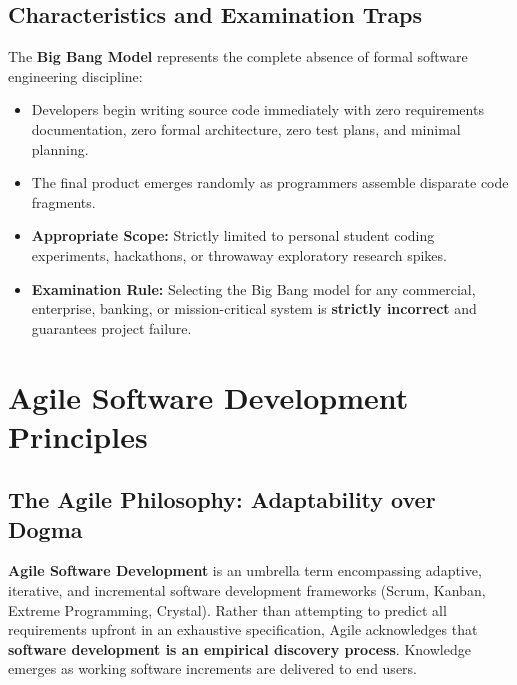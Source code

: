 \subsection{Characteristics and Examination Traps}
The \textbf{Big Bang Model} represents the complete absence of formal software engineering discipline:
\begin{itemize}
    \item Developers begin writing source code immediately with zero requirements documentation, zero formal architecture, zero test plans, and minimal planning.
    \item The final product emerges randomly as programmers assemble disparate code fragments.
    \item \textbf{Appropriate Scope:} Strictly limited to personal student coding experiments, hackathons, or throwaway exploratory research spikes.
    \item \textbf{Examination Rule:} Selecting the Big Bang model for any commercial, enterprise, banking, or mission-critical system is \textbf{strictly incorrect} and guarantees project failure.
\end{itemize}



\section{Agile Software Development Principles}
\label{sec:se_agile_principles}

\subsection{The Agile Philosophy: Adaptability over Dogma}
\textbf{Agile Software Development} is an umbrella term encompassing adaptive, iterative, and incremental software development frameworks (Scrum, Kanban, Extreme Programming, Crystal). Rather than attempting to predict all requirements upfront in an exhaustive specification, Agile acknowledges that \textbf{software development is an empirical discovery process}. Knowledge emerges as working software increments are delivered to end users.

